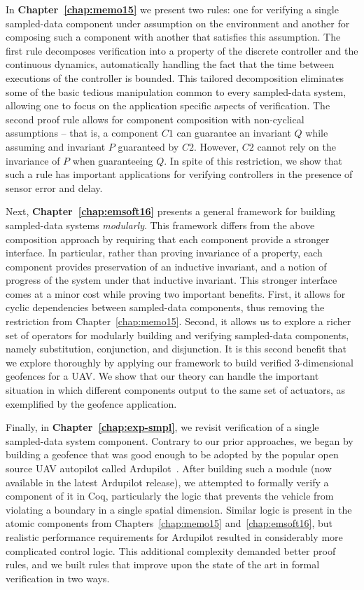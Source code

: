 \documentclass[12pt]{ucsddissertation}
\begin{document}
\begin{dissertationintroduction}
In \textbf{Chapter~\ref{chap:memo15}} we present two rules: one for
verifying a single sampled-data component under assumption on the
environment and another for composing such a component with another that
satisfies this assumption. The first rule decomposes verification into a
property of the discrete controller and the continuous dynamics,
automatically handling the fact that the time between executions of the
controller is bounded. This tailored decomposition eliminates some of the
basic tedious manipulation common to every sampled-data system, allowing
one to focus on the application specific aspects of verification. The
second proof rule allows for component composition with non-cyclical
assumptions -- that is, a component $C1$ can guarantee an invariant $Q$
while assuming and invariant $P$ guaranteed by $C2$. However, $C2$ cannot
rely on the invariance of $P$ when guaranteeing $Q$. In spite of this
restriction, we show that such a rule has important applications for
verifying controllers in the presence of sensor error and delay.

Next, \textbf{Chapter~\ref{chap:emsoft16}} presents a general framework for
building sampled-data systems \emph{modularly}. This framework differs from
the above composition approach by requiring that each component provide a
stronger interface. In particular, rather than proving invariance of a
property, each component provides preservation of an inductive invariant,
and a notion of progress of the system under that inductive invariant. This
stronger interface comes at a minor cost while proving two important
benefits. First, it allows for cyclic dependencies between sampled-data
components, thus removing the restriction from
Chapter~\ref{chap:memo15}. Second, it allows us to explore a richer set of
operators for modularly building and verifying sampled-data components,
namely substitution, conjunction, and disjunction. It is this second
benefit that we explore thoroughly by applying our framework to build
verified 3-dimensional geofences for a UAV. We show that our theory can
handle the important situation in which different components output to the
same set of actuators, as exemplified by the geofence application.

Finally, in \textbf{Chapter~\ref{chap:exp-smpl}}, we revisit verification
of a single sampled-data system component. Contrary to our prior
approaches, we began by building a geofence that was good enough to be
adopted by the popular open source UAV autopilot called
Ardupilot~\cite{ardupilot}. After building such a module (now available in the
latest Ardupilot release), we attempted to formally verify a component of
it in Coq, particularly the logic that prevents the vehicle from violating
a boundary in a single spatial dimension. Similar logic is present in the
atomic components from Chapters~\ref{chap:memo15} and~\ref{chap:emsoft16},
but realistic performance requirements for Ardupilot resulted in
considerably more complicated control logic. This additional complexity
demanded better proof rules, and we built rules that improve upon the state
of the art in formal verification in two ways.


\end{dissertationintroduction}
\end{document}

